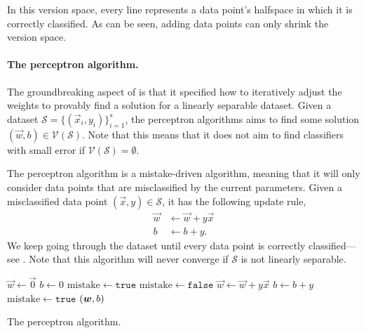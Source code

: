 \begin{marginfigure}
    \centering
    \caption{In this version space, every line represents a data point's halfspace in which it is correctly classified. As can be seen, adding data points can only shrink the version space.}
    \label{fig:version-space}
\end{marginfigure}

\paragraph{The perceptron algorithm.} The groundbreaking aspect of \citep{rosenblatt1958perceptron} is that it specified how to
iteratively adjust the weights to provably find a solution for a linearly separable
dataset.
Given a dataset $\mathcal{S} = \{ (\vec{x}_i,y_i) \}_{i=1}^s$, the perceptron algorithms aims to
find some solution $(\vec{w},b) \in \mathcal{V}(\mathcal{S})$. Note that this means that it does
not aim to find classifiers with small error if $\mathcal{V}(\mathcal{S}) = \emptyset$.

The perceptron algorithm is a mistake-driven algorithm, meaning that it will only consider data
points that are misclassified by the current parameters. Given a misclassified data point
$(\vec{x}, y) \in \mathcal{S}$, it has the following update rule,
\begin{align*}
    \vec{w} & \gets \vec{w} + y \vec{x} \\
    b       & \gets b + y.
\end{align*}
We keep going through the dataset until every data point is correctly classified---see
. Note that this algorithm will never converge if $\mathcal{S}$ is not linearly
separable.

\begin{algorithm}[t]
    \begin{algorithmic}
        \State $\vec{w} \gets \vec{0}$
        \State $b \gets 0$
        \State $\mathrm{mistake} \gets \mathtt{true}$
        \State $\mathrm{mistake} \gets \mathtt{false}$
        \State $\vec{w} \gets \vec{w} + y \vec{x}$
        \State $b \gets b + y$
        \State $\mathrm{mistake} \gets \mathtt{true}$
        \EndIf
        \EndFor
        \EndWhile
        \State \Return $\lft( \vec{w}, b \rgt)$
    \end{algorithmic}
    \caption{The perceptron algorithm.}
    \label{alg:perc-alg}
\end{algorithm}

